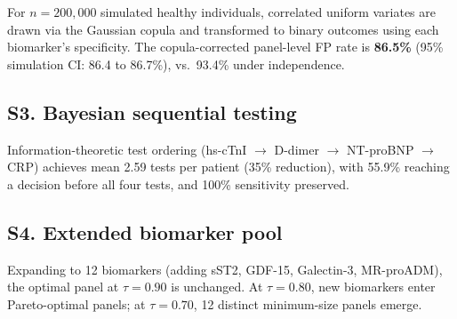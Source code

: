 \documentclass[11pt, oneside]{article}
\begin{document}
For $n = 200{,}000$ simulated healthy individuals, correlated uniform variates are drawn via the Gaussian copula and transformed to binary outcomes using each biomarker's specificity. The copula-corrected panel-level FP rate is \textbf{86.5\%} (95\% simulation CI: 86.4 to 86.7\%), vs.\ 93.4\% under independence.


\subsection*{S3. Bayesian sequential testing}

Information-theoretic test ordering (hs-cTnI $\to$ D-dimer $\to$ NT-proBNP $\to$ CRP) achieves mean 2.59 tests per patient (35\% reduction), with 55.9\% reaching a decision before all four tests, and 100\% sensitivity preserved.


\subsection*{S4. Extended biomarker pool}

Expanding to 12 biomarkers (adding sST2, GDF-15, Galectin-3, MR-proADM), the optimal panel at $\tau = 0.90$ is unchanged. At $\tau = 0.80$, new biomarkers enter Pareto-optimal panels; at $\tau = 0.70$, 12 distinct minimum-size panels emerge.
\end{document}
